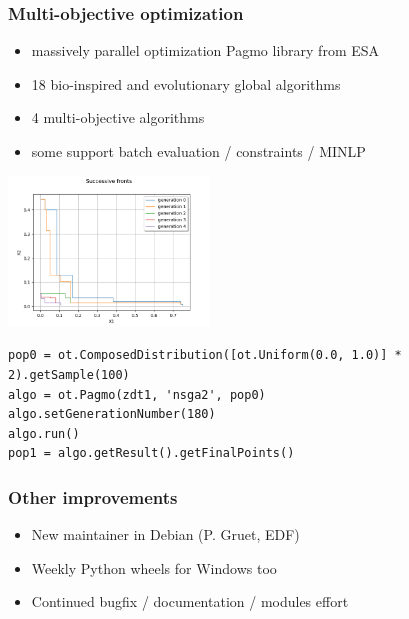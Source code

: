 \documentclass{beamer}
\begin{document}
\begin{frame}[containsverbatim]
\frametitle{Multi-objective optimization}

% 

\begin{itemize}
\item massively parallel optimization Pagmo library from ESA
\item 18 bio-inspired and evolutionary global algorithms
\item 4 multi-objective algorithms
\item some support batch evaluation / constraints / MINLP
\end{itemize}

\begin{center}
\includegraphics[width=0.4\textwidth]{figures/sphx_glr_plot_optimization_pagmo_002.png}
\end{center}

\begin{lstlisting}
pop0 = ot.ComposedDistribution([ot.Uniform(0.0, 1.0)] * 2).getSample(100)
algo = ot.Pagmo(zdt1, 'nsga2', pop0)
algo.setGenerationNumber(180)
algo.run()
pop1 = algo.getResult().getFinalPoints()
\end{lstlisting}


\end{frame}


\begin{frame}
\frametitle{Other improvements}

\begin{itemize}
\item New maintainer in Debian (P. Gruet, EDF)
\item Weekly Python wheels for Windows too
\item Continued bugfix / documentation / modules effort
\end{itemize}

\end{frame}
\end{document}
